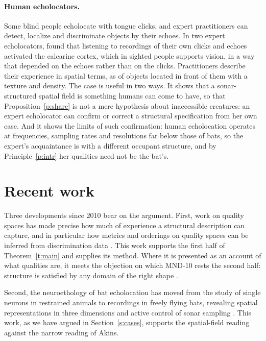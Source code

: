 \documentclass{situationist-preprint}
\begin{document}
\paragraph{Human echolocators.} Some blind people echolocate with tongue clicks, and expert practitioners can detect, localize and discriminate objects by their echoes. In two expert echolocators, \citet{Thaler2011} found that listening to recordings of their own clicks and echoes activated the calcarine cortex, which in sighted people supports vision, in a way that depended on the echoes rather than on the clicks. Practitioners describe their experience in spatial terms, as of objects located in front of them with a texture and density. The case is useful in two ways. It shows that a sonar-structured spatial field is something humans can come to have, so that Proposition~\ref{p:share} is not a mere hypothesis about inaccessible creatures: an expert echolocator can confirm or correct a structural specification from her own case. And it shows the limits of such confirmation: human echolocation operates at frequencies, sampling rates and resolutions far below those of bats, so the expert's acquaintance is with a different occupant structure, and by Principle~\ref{p:intr} her qualities need not be the bat's.

\section{Recent work}\label{s:recent}

Three developments since 2010 bear on the argument. First, work on quality spaces has made precise how much of experience a structural description can capture, and in particular how metrics and orderings on quality spaces can be inferred from discrimination data \citep{Rosenthal2010,Lee2021}. This work supports the first half of Theorem~\ref{t:main} and supplies its method. Where it is presented as an account of what qualities are, it meets the objection on which MND-10 rests the second half: structure is satisfied by any domain of the right shape \citep{Newman1928}.

Second, the neuroethology of bat echolocation has moved from the study of single neurons in restrained animals to recordings in freely flying bats, revealing spatial representations in three dimensions and active control of sonar sampling \citep{UlanovskyMoss2008,MossSurlykke2010}. This work, as we have argued in Section~\ref{s:cases}, supports the spatial-field reading against the narrow reading of Akins.
\end{document}
